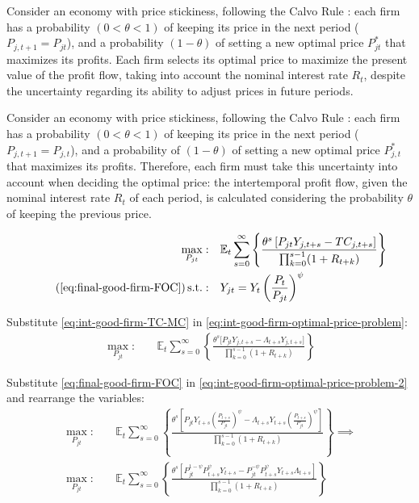 \documentclass[
	12pt,
	]{article}
\numberwithin{equation}{section}
\DeclareMathOperator{\st}{s.t.}
\newcommand{\E}[1][t]{{\mathbb{E}_{#1}}}
\theoremstyle{definition}
\theoremstyle{plain}
\theoremstyle{plain}
\theoremstyle{plain}
\begin{document}
Consider an economy with price stickiness, following the Calvo Rule \cite{calvo_staggered_1983}: each firm has a probability $(0 < \theta < 1)$ of keeping its price in the next period ($P_{j,t+1} = P_{jt}$), and a probability $(1 - \theta)$ of setting a new optimal price $P_{jt}^\ast$ that maximizes its profits. Each firm selects its optimal price to maximize the present value of the profit flow, taking into account the nominal interest rate $R_t$, despite the uncertainty regarding its ability to adjust prices in future periods.


Consider an economy with price stickiness, following the Calvo Rule \cite{calvo_staggered_1983}: each firm has a probability $(0 < \theta < 1)$ of keeping its price in the next period ($P_{j,t+1} = P_{j,t}$), and a probability of $(1 - \theta)$ of setting a new optimal price $P_{j,t}^\ast$ that maximizes its profits. Therefore, each firm must take this uncertainty into account when deciding the optimal price: the intertemporal profit flow, given the nominal interest rate $R_t$ of each period, is calculated considering the probability $\theta$ of keeping the previous price.



\begin{align}
\label{eq:int-good-firm-optimal-price-problem}
	\max_{P_{jt}}: & \quad \E \sum_{s=0}^{\infty} \left\{ \frac{ \theta^s \left[ P_{jt} Y_{j,t+s} - TC_{j,t+s} \right] }{\prod_{k=0}^{s-1}(1+R_{t+k})} \right\} \\
\tag{\ref{eq:final-good-firm-FOC}}
	\st: & \quad Y_{jt} = Y_t \left( \frac{P_t}{P_{jt}} \right)^{\psi}
\end{align}


Substitute \ref{eq:int-good-firm-TC-MC} in \ref{eq:int-good-firm-optimal-price-problem}:
\begin{align}
\label{eq:int-good-firm-optimal-price-problem-2}
	\max_{P_{jt}}: & \quad \E \sum_{s=0}^{\infty} \left\{ \frac{\theta^s \big[ P_{jt} Y_{j,t+s} - \Lambda_{t+s} Y_{j,t+s} \big]}{\prod_{k=0}^{s-1}(1+R_{t+k})} \right\}
\end{align}

Substitute \ref{eq:final-good-firm-FOC} in \ref{eq:int-good-firm-optimal-price-problem-2} and rearrange the variables:
\begin{align}
	\max_{P_{jt}}: & \quad \E \sum_{s=0}^{\infty} \left\{ \frac{\theta^s \left[ P_{jt} Y_{t+s} \left( \frac{P_{t+s}}{P_{jt}} \right)^{\psi} - \Lambda_{t+s} Y_{t+s} \left( \frac{P_{t+s}}{P_{jt}} \right)^{\psi} \right] }{\prod_{k=0}^{s-1}(1+R_{t+k})} \right\} \implies \nonumber 
\\
	\max_{P_{jt}}: & \quad \E \sum_{s=0}^{\infty} \left\{ \frac{\theta^s \left[ P_{jt}^{1-\psi} P_{t+s}^{\psi} Y_{t+s} - P_{jt}^{-\psi} P_{t+s}^{\psi} Y_{t+s} \Lambda_{t+s} \right] }{\prod_{k=0}^{s-1}(1+R_{t+k})} \right\} \nonumber
\end{align}
\end{document}
